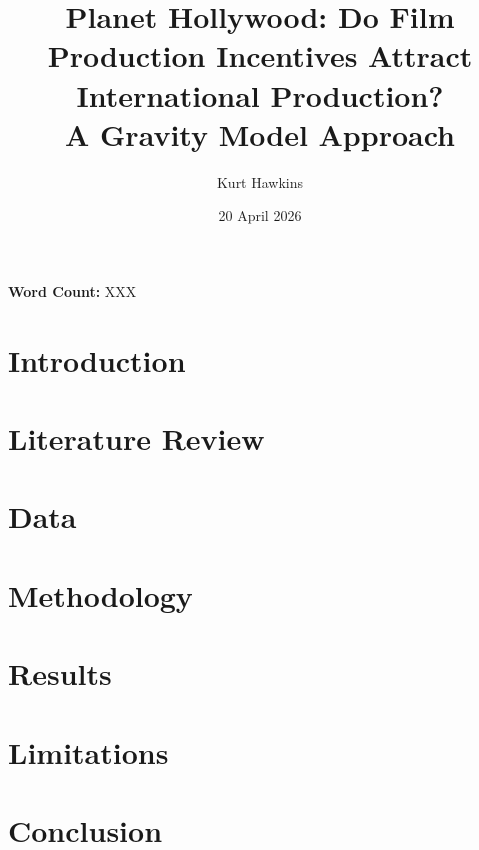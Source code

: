 \documentclass[12pt,a4paper]{article}
\title{\textbf{Planet Hollywood: Do Film Production Incentives Attract International Production? \\ A Gravity Model Approach}}
\author{Kurt Hawkins}
\date{20 April 2026}
\begin{document}
\maketitle
\thispagestyle{empty}

\noindent 

\noindent \textbf{Word Count:} XXX

\newpage

\section{Introduction}
\label{sec:introduction}

\section{Literature Review}
\label{sec:literature}

\section{Data}
\label{sec:data}

\section{Methodology}
\label{sec:methodology}

\section{Results}
\label{sec:results}

\section{Limitations}
\label{sec:limitations}

\section{Conclusion}
\label{sec:conclusion}

\clearpage
\appendix

\end{document}
